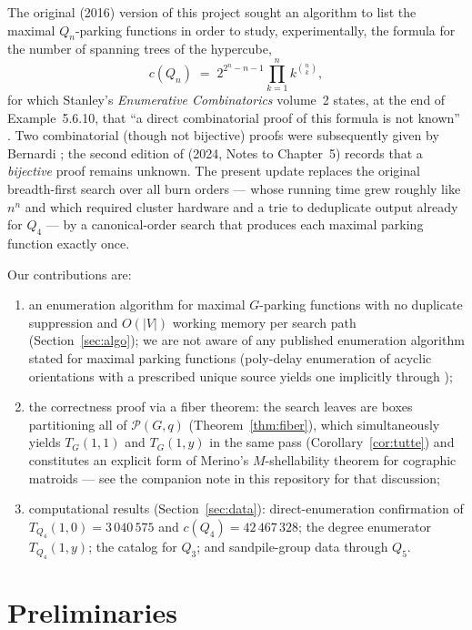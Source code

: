 \documentclass[11pt]{amsart}
\theoremstyle{definition}
\newcommand{\PF}{\mathcal{P}}
\begin{document}
The original (2016) version of this project sought an algorithm to list the
maximal $Q_n$-parking functions in order to study, experimentally, the
formula for the number of spanning trees of the hypercube,
\begin{equation}\label{eq:stanley}
  c(Q_n) \;=\; 2^{2^n-n-1}\prod_{k=1}^{n} k^{\binom nk},
\end{equation}
for which Stanley's \emph{Enumerative Combinatorics} volume~2 states, at
the end of Example~5.6.10, that ``a direct combinatorial proof of this
formula is not known'' \cite{ec2}. Two combinatorial (though not bijective)
proofs were subsequently given by Bernardi \cite{bernardi}; the second
edition of \cite{ec2} (2024, Notes to Chapter~5) records that a
\emph{bijective} proof remains unknown. The present update replaces the
original breadth-first search over all burn orders --- whose running time
grew roughly like $n^n$ and which required cluster hardware and a trie to
deduplicate output already for $Q_4$ --- by a canonical-order search that
produces each maximal parking function exactly once.

Our contributions are:
\begin{enumerate}
\item an enumeration algorithm for maximal $G$-parking functions with no
duplicate suppression and $O(|V|)$ working memory per search path
(Section~\ref{sec:algo}); we are not aware of any published enumeration
algorithm stated for maximal parking functions (poly-delay enumeration of
acyclic orientations with a prescribed unique source \cite{conte} yields
one implicitly through \cite[Thm.~3.1]{bct});
\item the correctness proof via a fiber theorem: the search leaves are
boxes partitioning all of $\PF(G,q)$ (Theorem~\ref{thm:fiber}), which
simultaneously yields $T_G(1,1)$ and $T_G(1,y)$ in the same pass
(Corollary~\ref{cor:tutte}) and constitutes an explicit form of Merino's
$M$-shellability theorem for cographic matroids \cite{merino01} --- see the
companion note in this repository for that discussion;
\item computational results (Section~\ref{sec:data}): direct-enumeration
confirmation of $T_{Q_4}(1,0)=3\,040\,575$ and
$c(Q_4)=42\,467\,328$; the degree enumerator $T_{Q_4}(1,y)$; the catalog
for $Q_3$; and sandpile-group data through $Q_5$.
\end{enumerate}

\section{Preliminaries}
\end{document}
